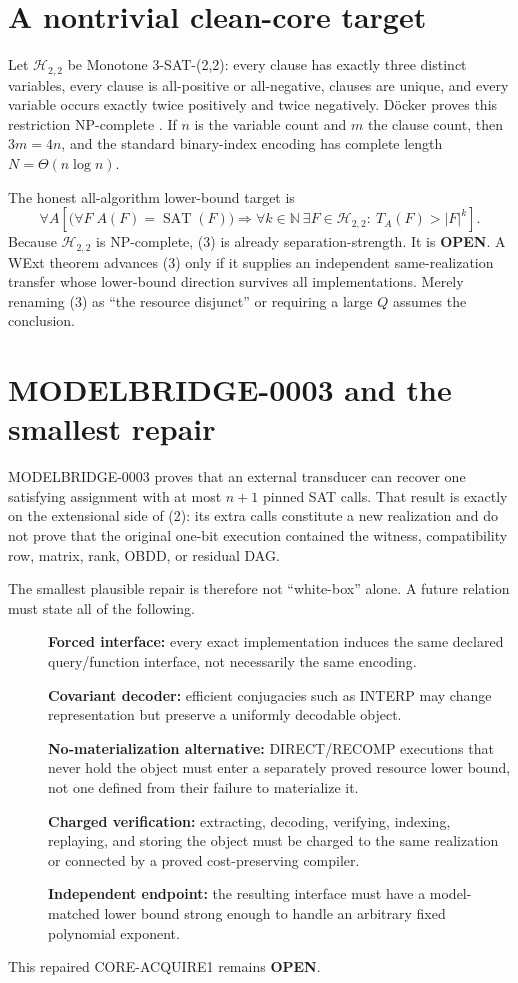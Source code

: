 \documentclass[11pt]{article}
\begin{document}
\section{A nontrivial clean-core target}
Let $\mathcal H_{2,2}$ be Monotone 3-SAT-(2,2): every clause has exactly
three distinct variables, every clause is all-positive or all-negative,
clauses are unique, and every variable occurs exactly twice positively and
twice negatively.  D\"ocker proves this restriction NP-complete
\cite{doecker}.  If $n$ is the variable count and $m$ the clause count, then
$3m=4n$, and the standard binary-index encoding has complete length
$N=\Theta(n\log n)$.

The honest all-algorithm lower-bound target is
\[
 \forall A\left[
   \bigl(\forall F\;A(F)=\operatorname{SAT}(F)\bigr)
   \Longrightarrow
   \forall k\in\mathbb N\ \exists F\in\mathcal H_{2,2}:\
   T_A(F)>|F|^k
 \right].                                                   \tag{3}
\]
Because $\mathcal H_{2,2}$ is NP-complete, (3) is already separation-strength.
It is \textbf{OPEN}.  A WExt theorem advances (3) only if it supplies an
independent same-realization transfer whose lower-bound direction survives
all implementations.  Merely renaming (3) as ``the resource disjunct'' or
requiring a large $Q$ assumes the conclusion.

\section{MODELBRIDGE-0003 and the smallest repair}
MODELBRIDGE-0003 proves that an external transducer can recover one satisfying
assignment with at most $n+1$ pinned SAT calls.  That result is exactly on the
extensional side of (2): its extra calls constitute a new realization and do
not prove that the original one-bit execution contained the witness,
compatibility row, matrix, rank, OBDD, or residual DAG.

The smallest plausible repair is therefore not ``white-box'' alone.  A
future relation must state all of the following.
\begin{description}
\item[] \textbf{Forced interface:} every exact implementation induces the
same declared query/function interface, not necessarily the same encoding.
\item[] \textbf{Covariant decoder:} efficient conjugacies such as INTERP may
change representation but preserve a uniformly decodable object.
\item[] \textbf{No-materialization alternative:} DIRECT/RECOMP executions
that never hold the object must enter a separately proved resource lower
bound, not one defined from their failure to materialize it.
\item[] \textbf{Charged verification:} extracting, decoding, verifying,
indexing, replaying, and storing the object must be charged to the same
realization or connected by a proved cost-preserving compiler.
\item[] \textbf{Independent endpoint:} the resulting interface must have a
model-matched lower bound strong enough to handle an arbitrary fixed
polynomial exponent.
\end{description}
This repaired \textsf{CORE-ACQUIRE1} remains \textbf{OPEN}.
\end{document}
